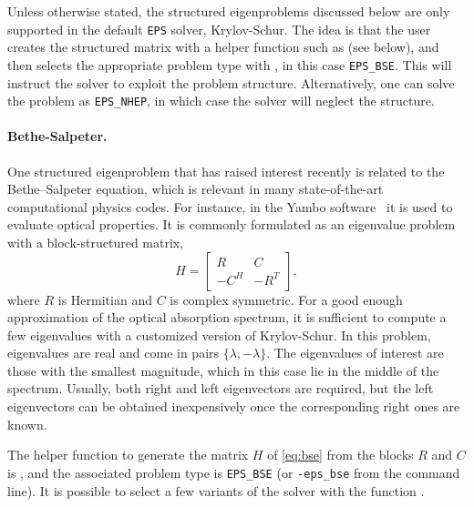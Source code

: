 Unless otherwise stated, the structured eigenproblems discussed below are only supported in the default \texttt{EPS} solver, Krylov-Schur. The idea is that the user creates the structured matrix with a helper function such as  (see below), and then selects the appropriate problem type with , in this case \texttt{EPS\_BSE}. This will instruct the solver to exploit the problem structure. Alternatively, one can solve the problem as \texttt{EPS\_NHEP}, in which case the solver will neglect the structure.

\paragraph{Bethe-Salpeter.}
One structured eigenproblem that has raised interest recently is related to the Bethe--Salpeter equation, which is relevant in many state-of-the-art computational physics codes. For instance, in the Yambo software~\citep{Sangalli:2019:MBP} it is used to evaluate optical properties. It is commonly formulated as an eigenvalue problem with a block-structured matrix,
\begin{equation}\label{eq:bse}
H = \begin{bmatrix}
        R & C \\
        -C^H & -R^T
    \end{bmatrix},
\end{equation}
where \(R\) is Hermitian and \(C\) is complex symmetric. For a good enough approximation of the optical absorption spectrum, it is sufficient to compute a few eigenvalues with a customized version of Krylov-Schur. In this problem, eigenvalues are real and come in pairs $\{\lambda,-\lambda\}$. The eigenvalues of interest are those with the smallest magnitude, which in this case lie in the middle of the spectrum. Usually, both right and left eigenvectors are required, but the left eigenvectors can be obtained inexpensively once the corresponding right ones are known.

The helper function to generate the matrix $H$ of \eqref{eq:bse} from the blocks $R$ and $C$ is , and the associated problem type is \texttt{EPS\_BSE} (or \verb!-eps_bse! from the command line). It is possible to select a few variants of the solver with the function .

